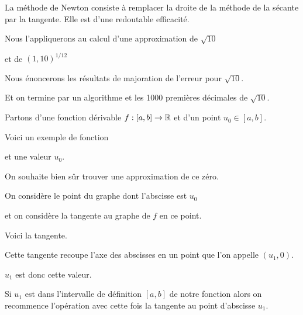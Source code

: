 







\debuttexte


\diapo

\change

\change

La méthode de Newton consiste à remplacer 
la droite de la méthode de la sécante par la tangente.
Elle est d'une redoutable efficacité.

\change

Nous l'appliquerons au calcul d'une approximation de $\sqrt{10}$

\change

et de $(1,10)^{1/12}$

\change

Nous énoncerons les résultats de majoration de l'erreur pour $\sqrt{10}$.

\change

Et on termine par un algorithme et les 1000 premières décimales de $\sqrt{10}$.


\diapo



Partons d'une fonction dérivable $f:[a,b] \to \mathbb{R}$ et d'un point $u_0 \in[a,b]$.

\change
Voici un exemple de fonction 

\change
et une valeur $u_0$.

On souhaite bien sûr trouver une approximation de ce zéro.

\change
On considère le point du graphe dont l'abscisse est $u_0$




\change
et on considère la tangente au graphe de $f$ en ce point.


\change
Voici la tangente.

\change
Cette tangente recoupe l'axe des abscisses en un point que l'on appelle $(u_1,0)$.

\change

$u_1$ est donc cette valeur.

\change

Si $u_1$ est dans l'intervalle de définition $[a,b]$ de notre fonction
alors on recommence l'opération avec cette fois la tangente au point d'abscisse $u_1$.

